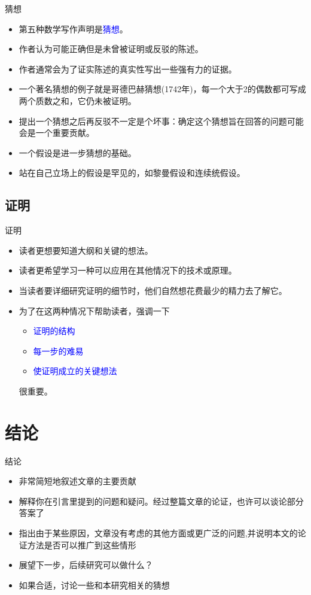 \documentclass[13pt]{ctexbeamer}
\newcommand{\blue}[1]{\textcolor{blue}{#1}}
\begin{document}
\begin{frame}{猜想}
\begin{itemize}
\item 第五种数学写作声明是\blue{猜想}。
\item 作者认为可能正确但是未曾被证明或反驳的陈述。
\item 作者通常会为了证实陈述的真实性写出一些强有力的证据。
\item  一个著名猜想的例子就是哥德巴赫猜想(1742年)，每一个大于2的偶数都可写成两个质数之和，它仍未被证明。
\item 提出一个猜想之后再反驳不一定是个坏事：确定这个猜想旨在回答的问题可能会是一个重要贡献。


\item 一个假设是进一步猜想的基础。
\item 站在自己立场上的假设是罕见的，如黎曼假设和连续统假设。
\end{itemize}
\end{frame}


\subsection{证明}

\begin{frame}{证明}
	\begin{itemize}
		\item 读者更想要知道大纲和关键的想法。
		\item 读者更希望学习一种可以应用在其他情况下的技术或原理。
		\item 当读者要详细研究证明的细节时，他们自然想花费最少的精力去了解它。
		\item 为了在这两种情况下帮助读者，强调一下
		\begin{itemize}
		\item \blue{证明的结构}
		\item \blue{每一步的难易}
		\item \blue{使证明成立的关键想法}
		\end{itemize}
		很重要。
		
	\end{itemize}
\end{frame}




\section{结论}
\begin{frame}{结论}
	
	\begin{itemize}
		\item  非常简短地叙述文章的主要贡献
		\item  解释你在引言里提到的问题和疑问。经过整篇文章的论证，也许可以谈论部分答案了
		\item 指出由于某些原因，文章没有考虑的其他方面或更广泛的问题,并说明本文的论证方法是否可以推广到这些情形
		\item  展望下一步，后续研究可以做什么？
		\item 如果合适，讨论一些和本研究相关的猜想
	\end{itemize}
\end{frame}
\end{document}
